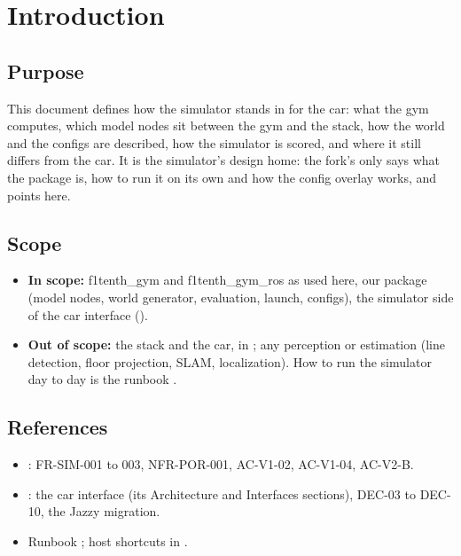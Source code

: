 \documentclass[11pt,a4paper]{article}
\begin{document}
\section{Introduction}
\subsection{Purpose}
This document defines how the simulator stands in for the car: what the gym computes, which model nodes sit between the gym and the stack, how the world and the configs are described, how the simulator is scored, and where it still differs from the car. It is the simulator's design home: the fork's  only says what the package is, how to run it on its own and how the config overlay works, and points here.

\subsection{Scope}
\begin{itemize}
  \item \textbf{In scope:} f1tenth\_gym and f1tenth\_gym\_ros as used here, our  package (model nodes, world generator, evaluation, launch, configs), the simulator side of the car interface ().
  \item \textbf{Out of scope:} the stack and the car, in ; any perception or estimation (line detection, floor projection, SLAM, localization). How to run the simulator day to day is the runbook .
\end{itemize}

\subsection{References}
\begin{itemize}
  \item {}: FR-SIM-001 to 003, NFR-POR-001, AC-V1-02, AC-V1-04, AC-V2-B.
  \item {}: the car interface (its Architecture and Interfaces sections), DEC-03 to DEC-10, the Jazzy migration.
  \item Runbook ; host shortcuts in .
\end{itemize}
\end{document}
